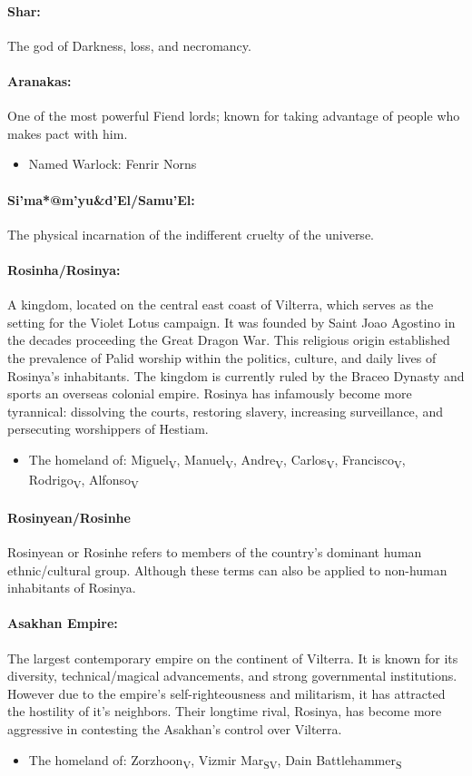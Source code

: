 \documentclass[../main.tex]{subfiles}
\begin{document}
\paragraph{Shar:}
The god of Darkness, loss, and necromancy.
\paragraph{Aranakas:}
One of the most powerful Fiend lords; known for taking advantage of people who makes pact with him.
\begin{itemize}
    \item Named Warlock: Fenrir Norns
\end{itemize}
\paragraph{Si’ma*@m’yu\&d’El/Samu’El:}
The physical incarnation of the indifferent cruelty of the universe.
\paragraph{Rosinha/Rosinya:}
A kingdom, located on the central east coast of Vilterra, which serves as the setting for the Violet Lotus campaign. It was founded by Saint Joao Agostino in the decades proceeding the Great Dragon War. This religious origin established the prevalence of Palid worship within the politics, culture, and daily lives of Rosinya’s inhabitants. The kingdom is currently ruled by the Braceo Dynasty and sports an overseas colonial empire. Rosinya has infamously become more tyrannical: dissolving the courts, restoring slavery, increasing surveillance, and persecuting worshippers of Hestiam.
\begin{itemize}
    \item The homeland of: Miguel\textsubscript{V}, Manuel\textsubscript{V}, Andre\textsubscript{V}, Carlos\textsubscript{V}, Francisco\textsubscript{V}, Rodrigo\textsubscript{V}, Alfonso\textsubscript{V}
\end{itemize}
\paragraph{Rosinyean/Rosinhe}
Rosinyean or Rosinhe refers to members of the country’s dominant human ethnic/cultural group. Although these terms can also be applied to non-human inhabitants of Rosinya.
\paragraph{Asakhan Empire:}
The largest contemporary empire on the continent of Vilterra. It is known for its diversity, technical/magical advancements, and strong governmental institutions. However due to the empire’s self-righteousness and militarism, it has attracted the hostility of it’s neighbors. Their longtime rival, Rosinya, has become more aggressive in contesting the Asakhan’s control over Vilterra.
\begin{itemize}
    \item The homeland of: Zorzhoon\textsubscript{V}, Vizmir Mar\textsubscript{SV}, Dain Battlehammer\textsubscript{S}
\end{itemize}
\end{document}
